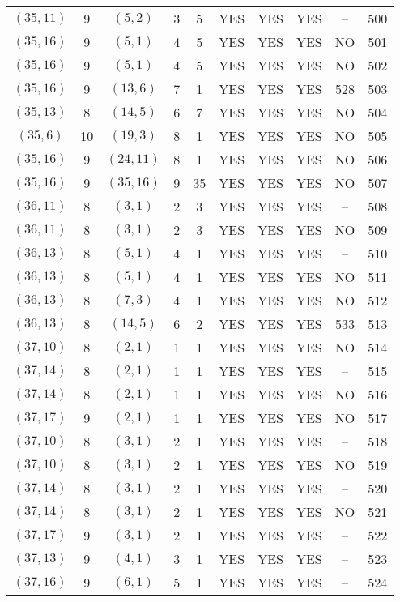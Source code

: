 \begin{longtable}{|c|c|c|c|c|c|c|c|c|c|}
$(35, 11)$ & 9 & $(5, 2)$ & 3 & 5 & YES & YES & YES & -- & 500\\
$(35, 16)$ & 9 & $(5, 1)$ & 4 & 5 & YES & YES & YES & NO & 501\\
$(35, 16)$ & 9 & $(5, 1)$ & 4 & 5 & YES & YES & YES & NO & 502\\
$(35, 16)$ & 9 & $(13, 6)$ & 7 & 1 & YES & YES & YES & 528 & 503\\
$(35, 13)$ & 8 & $(14, 5)$ & 6 & 7 & YES & YES & YES & NO & 504\\
$(35, 6)$ & 10 & $(19, 3)$ & 8 & 1 & YES & YES & YES & NO & 505\\
$(35, 16)$ & 9 & $(24, 11)$ & 8 & 1 & YES & YES & YES & NO & 506\\
$(35, 16)$ & 9 & $(35, 16)$ & 9 & 35 & YES & YES & YES & NO & 507\\
$(36, 11)$ & 8 & $(3, 1)$ & 2 & 3 & YES & YES & YES & -- & 508\\
$(36, 11)$ & 8 & $(3, 1)$ & 2 & 3 & YES & YES & YES & NO & 509\\
$(36, 13)$ & 8 & $(5, 1)$ & 4 & 1 & YES & YES & YES & -- & 510\\
$(36, 13)$ & 8 & $(5, 1)$ & 4 & 1 & YES & YES & YES & NO & 511\\
$(36, 13)$ & 8 & $(7, 3)$ & 4 & 1 & YES & YES & YES & NO & 512\\
$(36, 13)$ & 8 & $(14, 5)$ & 6 & 2 & YES & YES & YES & 533 & 513\\
$(37, 10)$ & 8 & $(2, 1)$ & 1 & 1 & YES & YES & YES & NO & 514\\
$(37, 14)$ & 8 & $(2, 1)$ & 1 & 1 & YES & YES & YES & -- & 515\\
$(37, 14)$ & 8 & $(2, 1)$ & 1 & 1 & YES & YES & YES & NO & 516\\
$(37, 17)$ & 9 & $(2, 1)$ & 1 & 1 & YES & YES & YES & NO & 517\\
$(37, 10)$ & 8 & $(3, 1)$ & 2 & 1 & YES & YES & YES & -- & 518\\
$(37, 10)$ & 8 & $(3, 1)$ & 2 & 1 & YES & YES & YES & NO & 519\\
$(37, 14)$ & 8 & $(3, 1)$ & 2 & 1 & YES & YES & YES & -- & 520\\
$(37, 14)$ & 8 & $(3, 1)$ & 2 & 1 & YES & YES & YES & NO & 521\\
$(37, 17)$ & 9 & $(3, 1)$ & 2 & 1 & YES & YES & YES & -- & 522\\
$(37, 13)$ & 9 & $(4, 1)$ & 3 & 1 & YES & YES & YES & -- & 523\\
$(37, 16)$ & 9 & $(6, 1)$ & 5 & 1 & YES & YES & YES & -- & 524\\

\end{longtable}
